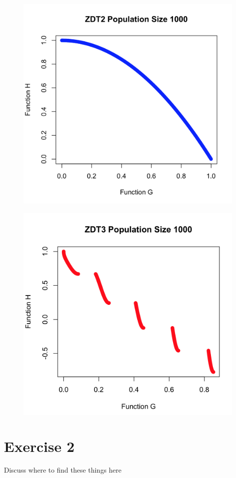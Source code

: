 \documentclass[a4paper,12pt]{article}
\begin{document}
\begin{figure}[h]
\centering
\begin{minipage}{.5\textwidth}
  \centering
  \includegraphics[width=.8\linewidth]{q1graphs/zdt2_1000.png}
  \label{fig:zdt21000}
\end{minipage}%
\begin{minipage}{.5\textwidth}
  \centering
  \includegraphics[width=.8\linewidth]{q1graphs/zdt3_1000.png}
  \label{fig:zdt31000}
\end{minipage}
\end{figure}

\section*{Exercise 2}
Discuss where to find these things here
\end{document}
